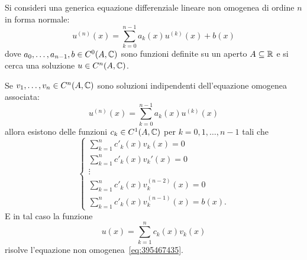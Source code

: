 \begin{theorem}
\mymark{***}
Si consideri una generica equazione differenziale lineare non omogenea di ordine $n$ in forma normale:
\begin{equation}\label{eq:395467435}
  u^{(n)}(x) = \sum_{k=0}^{n-1} a_k(x) u^{(k)}(x) + b(x)
\end{equation}
dove $a_0, \dots, a_{n-1}, b\in C^0(A,\mathbb C)$ sono funzioni definite su un aperto $A\subseteq \mathbb R$
e si cerca una soluzione $u\in C^n(A,\mathbb C)$.

Se $v_1, \dots, v_n\in C^n(A,\mathbb C)$ sono soluzioni indipendenti dell'equazione omogenea associata:
\begin{equation*}
  u^{(n)}(x) = \sum_{k=0}^{n-1} a_k(x) u^{(k)}(x)
\end{equation*}
allora
esistono delle funzioni $c_k\in C^1(A,\mathbb C)$
per $k=0,1, \dots, n-1$
tali che
\begin{equation}\label{eq:02154676}
  \begin{cases}
    \sum_{k=1}^n c'_k(x) v_k(x) = 0 \\
    \sum_{k=1}^n c'_k(x) v_k'(x) = 0 \\
    \vdots\\
    \sum_{k=1}^n c'_k(x) v_k^{(n-2)}(x) = 0 \\
    \sum_{k=1}^n c'_k(x) v_k^{(n-1)}(x) = b(x).
  \end{cases}
\end{equation}
E in tal caso la funzione
\[
 u(x) = \sum_{k=1}^n c_k(x) v_k(x)
\]
risolve l'equazione non omogenea~\eqref{eq:395467435}.
\end{theorem}
%
